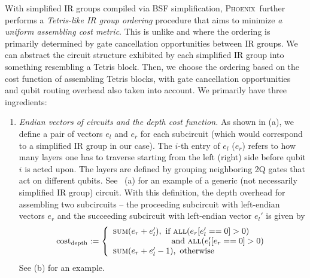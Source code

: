 \documentclass[conference,9pt]{IEEEtran}
\newcommand{\phoenix}{\textsc{Phoenix}}
\newcommand{\eRrightPre}{e_r}
\newcommand{\eLeftPost}{e_l'}
\begin{document}
    With simplified IR groups compiled via BSF simplification, \phoenix\ further performs a \emph{Tetris-like IR group ordering} procedure that aims to minimize \textit{a uniform assembling cost metric}. This is unlike \cite{li2022paulihedral} and \cite{jin2024tetris} where the ordering is primarily determined by gate cancellation opportunities between IR groups. We can abstract the circuit structure exhibited by each simplified IR group into something resembling a Tetris block. Then, we choose the ordering based on the cost function of assembling Tetris blocks, with gate cancellation opportunities and qubit routing overhead also taken into account. We primarily have three ingredients:
    \begin{enumerate}
        \item \textit{Endian vectors of circuits and the depth cost function.} As shown in  (a), we define a pair of vectors $e_l$ and $e_r$ for each subcircuit (which would correspond to a simplified IR group in our case). The $i$-th entry of $e_l$ ($e_r$) refers to how many layers one has to traverse starting from the left (right) side before qubit $i$ is acted upon. The layers are defined by grouping neighboring 2Q gates that act on different qubits. See~ (a) for an example of a generic (not necessarily simplified IR group) circuit.
        With this definition, the depth overhead for assembling two subcircuits -- the proceeding subcircuit with left-endian vectors $e_r$ and the succeeding subcircuit with left-endian vector $e_l'$ is given by
        \begin{align*}
            \mathrm{cost}_\mathrm{depth} :=  
                    \left\{
                    \begin{array}{ll}
                    \textsc{sum}(\eRrightPre + \eLeftPost),  \text{ if } \textsc{all}(\eRrightPre[\eLeftPost == 0] > 0) \\\qquad \text{    }\qquad\text{    }\qquad\text{   }\text{and }\textsc{all}(\eLeftPost[\eRrightPre == 0] > 0) \\
                    \textsc{sum}(\eRrightPre + \eLeftPost - 1), \text{ otherwise    }
                    \end{array}
                    \right.
        \end{align*}
        See  (b) for an example. %

\end{enumerate}
\end{document}
